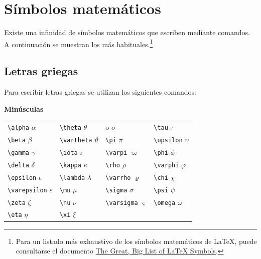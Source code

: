 \documentclass[
  spanish,
  a4paper,
]{scrreport}
\newcounter{none} %
\theoremstyle{definition}
\theoremstyle{remark}
\begin{document}
\section{Símbolos matemáticos}\label{suxedmbolos-matemuxe1ticos}

Existe una infinidad de símbolos matemáticos que escriben mediante
comandos. A continuación se muestran los más habituales.\footnote{Para
  un listado más exhaustivo de los símbolos matemáticos de LaTeX, puede
  consultarse el documento
  \href{https://www3.nd.edu/~nmark/UsefulFacts/LaTeX_symbols.pdf}{The
  Great, Big List of LaTeX Symbols}.}

\subsection{Letras griegas}\label{letras-griegas}

Para escribir letras griegas se utilizan los siguientes comandos:

\textbf{Minúsculas}

{\def\LTcaptype{none} %
\begin{longtable}[]{@{}
  >{\raggedright\arraybackslash}p{}
  >{\raggedright\arraybackslash}p{}
  >{\raggedright\arraybackslash}p{}
  >{\raggedright\arraybackslash}p{}@{}}
\toprule\noalign{}
\endhead
\bottomrule\noalign{}
\endlastfoot
\texttt{\textbackslash{}alpha} \(\alpha\) &
\texttt{\textbackslash{}theta} \(\theta\) & o \(o\) &
\texttt{\textbackslash{}tau} \(\tau\) \\
\texttt{\textbackslash{}beta} \(\beta\) &
\texttt{\textbackslash{}vartheta} \(\vartheta\) &
\texttt{\textbackslash{}pi} \(\pi\) & \texttt{\textbackslash{}upsilon}
\(\upsilon\) \\
\texttt{\textbackslash{}gamma} \(\gamma\) &
\texttt{\textbackslash{}iota} \(\iota\) & \texttt{\textbackslash{}varpi}
\(\varpi\) & \texttt{\textbackslash{}phi} \(\phi\) \\
\texttt{\textbackslash{}delta} \(\delta\) &
\texttt{\textbackslash{}kappa} \(\kappa\) & \texttt{\textbackslash{}rho}
\(\rho\) & \texttt{\textbackslash{}varphi} \(\varphi\) \\
\texttt{\textbackslash{}epsilon} \(\epsilon\) &
\texttt{\textbackslash{}lambda} \(\lambda\) &
\texttt{\textbackslash{}varrho} \(\varrho\) &
\texttt{\textbackslash{}chi} \(\chi\) \\
\texttt{\textbackslash{}varepsilon} \(\varepsilon\) &
\texttt{\textbackslash{}mu} \(\mu\) & \texttt{\textbackslash{}sigma}
\(\sigma\) & \texttt{\textbackslash{}psi} \(\psi\) \\
\texttt{\textbackslash{}zeta} \(\zeta\) & \texttt{\textbackslash{}nu}
\(\nu\) & \texttt{\textbackslash{}varsigma} \(\varsigma\) &
\texttt{\textbackslash{}omega} \(\omega\) \\
\texttt{\textbackslash{}eta} \(\eta\) & \texttt{\textbackslash{}xi}
\(\xi\) & & \\
\end{longtable}
}
\end{document}
